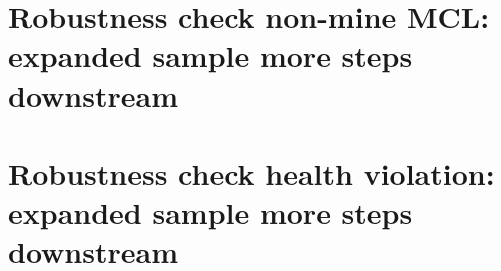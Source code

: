\documentclass{beamer}
\begin{document}
\begin{frame}{}

\end{frame}

\begin{frame}{}

\end{frame}

\begin{frame}{}

\end{frame}

\begin{frame}{}

\end{frame}

\section{Robustness check non-mine MCL: expanded sample more steps downstream}

\begin{frame}{}

\end{frame}

\begin{frame}{}

\end{frame}

\begin{frame}{}

\end{frame}

\begin{frame}{}

\end{frame}

\section{Robustness check health violation: expanded sample more steps downstream}

\begin{frame}{}

\end{frame}

\begin{frame}{}

\end{frame}

\begin{frame}{}

\end{frame}
\end{document}
